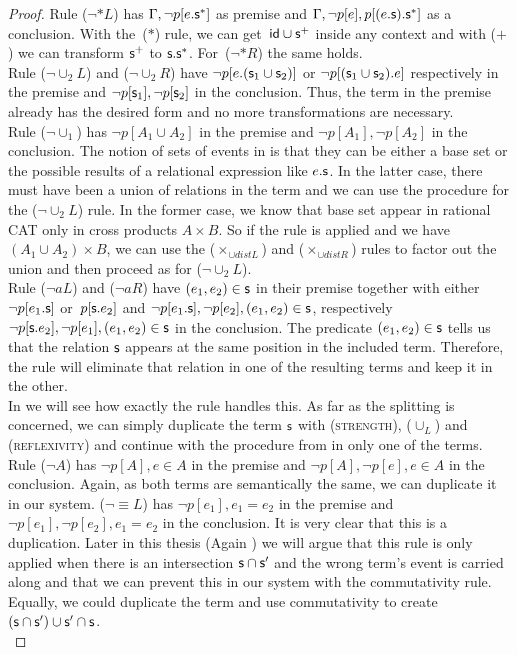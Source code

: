 \documentclass[a4paper,twoside,12pt, english]{article}
\begin{document}
\begin{proof}
Rule ($\neg {*}L$) has $\Gamma, \neg p[e.\textsf{\upshape s}^*]$ as premise and $\Gamma, \neg p[e], p[(e.\textsf{\upshape s}).\textsf{\upshape s}^*]$ as a conclusion. With the~($*$) rule, we can get~${\textsf{\upshape id} \cup \textsf{\upshape s}^+}$ inside any context and with ($+$) we can transform $\textsf{\upshape s}^+$ to $\textsf{\upshape s}.\textsf{\upshape s}^*$.
For~($\neg {*}R$) the same holds. \\

Rule ($\neg {\cup_2}L$) and ($\neg {\cup_2}R$) have $\neg p[e.(\textsf{\upshape s}_1 \cup \textsf{\upshape s}_2)]$ or $\neg p[(\textsf{\upshape s}_1 \cup \textsf{\upshape s}_2).e]$ respectively in the premise and $\neg p[\textsf{\upshape s}_1], \neg p[\textsf{\upshape s}_2]$ in the conclusion. Thus, the term in the premise already has the desired form and no more transformations are necessary. \\

Rule ($\neg \cup_1$) has $\neg p[A_1 \cup A_2]$ in the premise and $\neg p[A_1], \neg p[A_2]$ in the conclusion. The notion of sets of events in \cite{Gru+26} is that they can be either a base set or the possible results of a relational expression like $e.\textsf{\upshape s}$. In the latter case, there must have been a union of relations in the term and we can use the procedure for the ($\neg {\cup_2}L$) rule.
In the former case, we know that base set appear in rational CAT only in cross products $A \times B$. So if the rule is applied and we have $(A_1 \cup A_2) \times B$, we can use the ($\times_{\cup distL}$) and ($\times_{\cup distR}$) rules to factor out the union and then proceed as for ($\neg \cup_2 L$). \\

Rule ($\neg aL$) and ($\neg aR$) have $(e_1,e_2) \in \textsf{\upshape s}$ in their premise together with either $\neg p[e_1.\textsf{\upshape s}]$ or~$p[\textsf{\upshape s}.e_2]$ and $\neg p[e_1.\textsf{\upshape s}], \neg p[e_2], (e_1,e_2) \in \textsf{\upshape s}$, respectively $\neg p[\textsf{\upshape s}.e_2], \neg p[e_1], (e_1,e_2) \in \textsf{\upshape s}$ in the conclusion. The predicate $(e_1,e_2) \in \textsf{\upshape s}$ tells us that the relation $\textsf{\upshape s}$ appears at the same position in the included term. Therefore, the rule will eliminate that relation in one of the resulting terms and keep it in the other. \\ \newpage
In  we will see how exactly the rule handles this. As far as the splitting is concerned, we can simply duplicate the term $\textsf{\upshape s}$ with (\textsc{strength}), ($\cup_L$) and (\textsc{reflexivity}) and continue with the procedure from  in only one of the terms. \\

Rule ($\neg A$) has $\neg p[A], e \in A$ in the premise and $\neg p[A], \neg p[e], e \in A$ in the conclusion. Again, as both terms are semantically the same, we can duplicate it in our system.
($\neg {\equiv}L$) has $\neg p[e_1], e_1=e_2$ in the premise and $\neg p[e_1], \neg p[e_2], e_1=e_2$ in the conclusion. It is very clear that this is a duplication. Later in this thesis (Again ) we will argue that this rule is only applied when there is an intersection $\textsf{\upshape s} \cap \textsf{\upshape s}'$ and the wrong term's event is carried along and that we can prevent this in our system with the commutativity rule. Equally, we could duplicate the term and use commutativity to create $(\textsf{\upshape s} \cap \textsf{\upshape s}') \cup \textsf{\upshape s}' \cap \textsf{\upshape s}$.\\


\end{proof}
\end{document}

